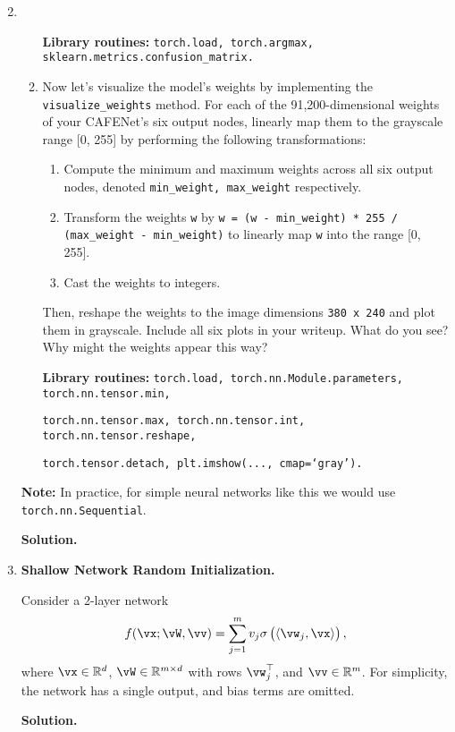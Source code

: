 \documentclass{article}
\theoremstyle{definition}
\theoremstyle{remark}
\newenvironment{Q}
{%
\clearpage
\item
}
{%
\phantom{s}%
\bigskip%
\noindent\textbf{Solution.}
}
\begin{document}
\begin{enumerate}[font={\Large\bfseries},left=0pt]
\begin{Q}
\begin{enumerate}
        \textbf{Library routines:} \texttt{torch.load, torch.argmax, sklearn.metrics.confusion\_matrix.}
            
        \item Now let's visualize the model's weights by implementing the \texttt{visualize\_weights} method. For each of the 91,200-dimensional weights of your CAFENet's six output nodes, linearly map them to the grayscale range [0, 255] by performing the following transformations:
        \begin{enumerate}
            \item Compute the minimum and maximum weights across all six output nodes, denoted \texttt{min\_weight, max\_weight} respectively.
            \item Transform the weights \texttt{w} by \texttt{w = (w - min\_weight) * 255 / (max\_weight - min\_weight)} to linearly map \texttt{w} into the range [0, 255].
            \item Cast the weights to integers.
        \end{enumerate}
        Then, reshape the weights to the image dimensions \texttt{380 x 240} and plot them in grayscale. Include all six plots in your writeup. What do you see? Why might the weights appear this way?
        
        \textbf{Library routines:} \texttt{torch.load, torch.nn.Module.parameters, torch.nn.tensor.min,}
        
        \texttt{torch.nn.tensor.max, torch.nn.tensor.int, torch.nn.tensor.reshape,}
        
        \texttt{torch.tensor.detach, plt.imshow(..., cmap=`gray').}
        
    \end{enumerate}
    \textbf{Note:} In practice, for simple neural networks like this we would use \texttt{torch.nn.Sequential}.
    
\end{Q}
 
   \begin{Q}
    \textbf{\Large Shallow Network Random Initialization.}

    Consider a 2-layer network
    \begin{align*}
        f(\vx;\vW,\vv)=\sum_{j=1}^{m}v_j\sigma\del{\langle\vw_j,\vx\rangle},
    \end{align*}
    where $\vx\in \mathbb{R}^d$, $\vW\in \mathbb{R}^{m\times d}$ with rows $\vw_j^\top$, and $\vv\in \mathbb{R}^m$. For simplicity, the network has a single output, and bias terms are omitted.


\end{Q}
\end{enumerate}
\end{document}

